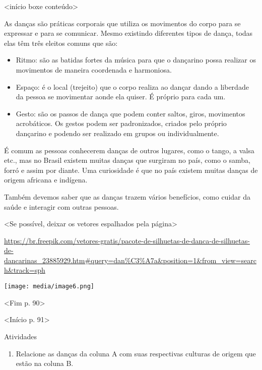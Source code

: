 \textless{}início boxe conteúdo\textgreater{}

As danças são práticas corporais que utiliza os movimentos do corpo para
se expressar e para se comunicar. Mesmo existindo diferentes tipos de
dança, todas elas têm três eleitos comuns que são:

\begin{itemize}
\item
  Ritmo: são as batidas fortes da música para que o dançarino possa
  realizar os movimentos de maneira coordenada e harmoniosa.
\item
  Espaço: é o local (trejeito) que o corpo realiza ao dançar dando a
  liberdade da pessoa se movimentar aonde ela quiser. É próprio para
  cada um.
\item
  Gesto: são os passos de dança que podem conter saltos, giros,
  movimentos acrobáticos. Os gestos podem ser padronizados, criados pelo
  próprio dançarino e podendo ser realizado em grupos ou
  individualmente.
\end{itemize}

É comum as pessoas conhecerem danças de outros lugares, como o tango, a
valsa etc., mas no Brasil existem muitas danças que surgiram no país,
como o samba, forró e assim por diante. Uma curiosidade é que no país
existem muitas danças de origem africana e indígena.

Também devemos saber que as danças trazem vários benefícios, como cuidar
da saúde e interagir com outras pessoas.

\textless{}Se possível, deixar os vetores espalhados pela
página\textgreater{}

\url{https://br.freepik.com/vetores-gratis/pacote-de-silhuetas-de-danca-de-silhuetas-de-dancarinas_23885929.htm\#query=dan\%C3\%A7a\&position=1\&from_view=search\&track=sph}

\texttt{[image: media/image6.png]}

\textless{}Fim p. 90\textgreater{}

\textless{}Início p. 91\textgreater{}

Atividades

\begin{enumerate}
\def\labelenumi{\arabic{enumi}.}
\item
  Relacione as danças da coluna A com suas respectivas culturas de
  origem que estão na coluna B.
\end{enumerate}

